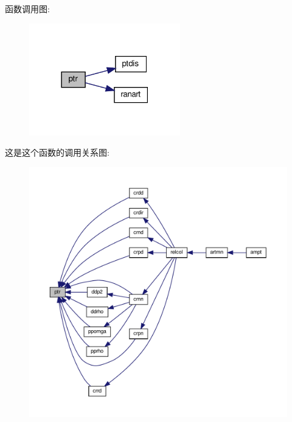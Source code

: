 函数调用图\+:
\nopagebreak
\begin{figure}[H]
\begin{center}
\leavevmode
\includegraphics[width=186pt]{ptr_8f90_aa9f8866324f11fd61fe214a333ef3c10_cgraph}
\end{center}
\end{figure}
这是这个函数的调用关系图\+:
\nopagebreak
\begin{figure}[H]
\begin{center}
\leavevmode
\includegraphics[width=350pt]{ptr_8f90_aa9f8866324f11fd61fe214a333ef3c10_icgraph}
\end{center}
\end{figure}
